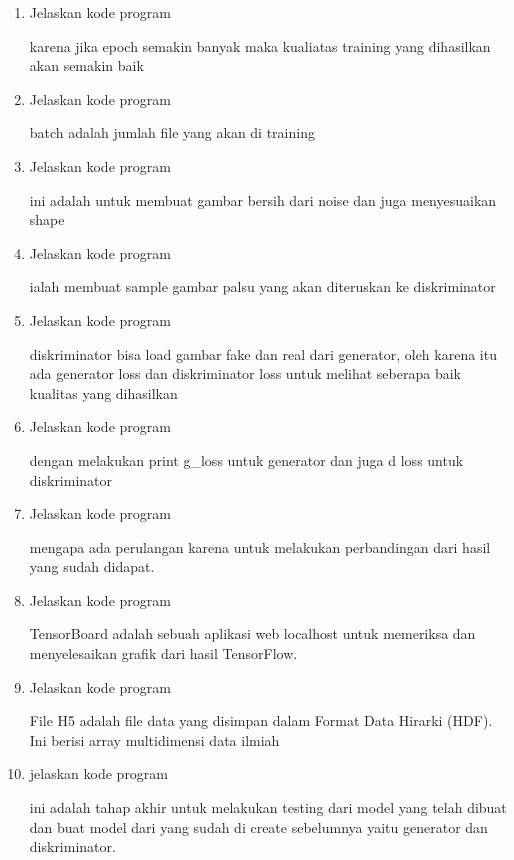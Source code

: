 \begin{enumerate}
\item Jelaskan kode program 

karena jika epoch semakin banyak maka kualiatas training yang dihasilkan akan semakin baik

\item Jelaskan kode program 

batch adalah jumlah file yang akan di training

\item Jelaskan kode program 

ini adalah untuk membuat gambar bersih dari noise dan juga menyesuaikan shape

\item Jelaskan kode program 

ialah membuat sample gambar palsu yang akan diteruskan ke diskriminator

\item Jelaskan kode program 

diskriminator bisa load gambar fake dan real dari generator, oleh karena itu ada generator loss dan diskriminator loss untuk melihat seberapa baik kualitas yang dihasilkan

\item Jelaskan kode program 

dengan melakukan print g\_loss untuk generator dan juga d loss untuk diskriminator

\item Jelaskan kode program 

mengapa ada perulangan karena untuk melakukan perbandingan dari hasil yang sudah didapat.

\item Jelaskan kode program 

TensorBoard adalah sebuah aplikasi web localhost untuk memeriksa dan menyelesaikan grafik dari hasil TensorFlow.

\item Jelaskan kode program 

File H5 adalah file data yang disimpan dalam Format Data Hirarki (HDF). Ini berisi array multidimensi data ilmiah

\item jelaskan kode program 

ini adalah tahap akhir untuk melakukan testing dari model yang telah dibuat dan buat model dari yang sudah di create sebelumnya yaitu generator dan diskriminator.


\end{enumerate}
